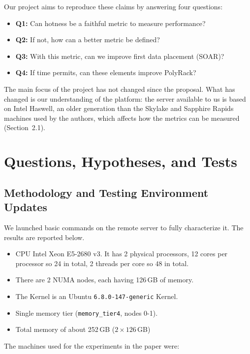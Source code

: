 \documentclass[10pt,a4paper]{article}
\begin{document}
Our project aims to reproduce these claims by answering four questions:
\begin{itemize}
  \item \textbf{Q1:} Can hotness be a faithful metric to measure performance?
  \item \textbf{Q2:} If not, how can a better metric be defined?
  \item \textbf{Q3:} With this metric, can we improve first data placement (SOAR)?
  \item \textbf{Q4:} If time permits, can these elements improve PolyRack?
\end{itemize}

The main focus of the project has not changed since the proposal. What has
changed is our understanding of the platform: the server available to us is
based on Intel Haswell, an older generation than the Skylake and Sapphire Rapids
machines used by the authors, which affects how the metrics can be measured
(Section~2.1).

\section{Questions, Hypotheses, and Tests}

\subsection{Methodology and Testing Environment Updates}

We launched basic commands on the remote server to fully characterize it. The results are reported below. 

\begin{itemize}
  \item CPU Intel Xeon E5-2680 v3. It has 2 physical processors, 12 cores per processor so 24 in total, 2 threads per core so 48 in total.
  \item There are 2 NUMA nodes, each having 126\,GB of memory. 
  \item The Kernel is an Ubuntu \texttt{6.8.0-147-generic} Kernel.
  \item Single memory tier (\texttt{memory\_tier4}, nodes 0-1). 
  \item Total memory of about 252\,GB ($2 \times 126$\,GB)
\end{itemize}

The machines used for the experiments in the paper were: 
\end{document}
